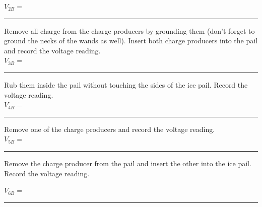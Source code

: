{{{{\vspace{0.5cm}

\hspace{4cm}$V_{2B}=$\rule{5.0cm}{0.1mm}

\vspace{0.5cm}
 \noindent Remove all charge from the charge producers by grounding
 them (don't forget to ground the necks of the wands as well).
 Insert both charge producers into the pail and record the voltage reading.\\

\vspace{1cm}
  \hspace{4cm}$V_{3B}=$\rule{5.0cm}{.1mm}
\vspace{0.5cm}

 \noindent Rub them inside the pail without touching the sides of the ice pail. Record the voltage
 reading.\\

\vspace{1.0cm}
  \hspace{4cm}$V_{4B}=$\rule{5.0cm}{.1mm}

\vspace{0.5cm}
 \noindent Remove one of the charge producers and
record the voltage reading.\\

\vspace{1cm}
  \hspace{4cm}$V_{5B}=$\rule{5.0cm}{.1mm}

\vspace{0.5cm}


\noindent Remove the charge producer from the pail and insert the
other into the ice pail.  Record the voltage reading.



\vspace{1cm}
  \hspace{4cm}$V_{6B}=$\rule{5.0cm}{.1mm}


}}}}
